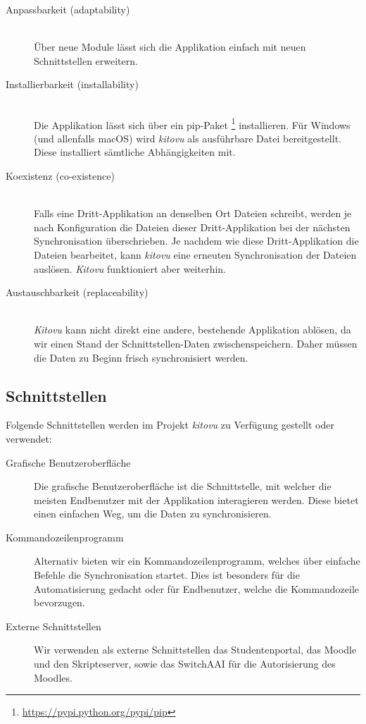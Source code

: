 \documentclass[a4paper]{article}
\begin{document}
\begin{description}
  \item[Anpassbarkeit (adaptability)] \strut \\
    Über neue Module lässt sich die Applikation einfach mit neuen Schnittstellen erweitern.
  \item[Installierbarkeit (installability)] \strut \\
    Die Applikation lässt sich über ein pip-Paket \footnote{\url{https://pypi.python.org/pypi/pip}} installieren. Für Windows (und allenfalls macOS) wird \emph{kitovu} als ausführbare Datei bereitgestellt. Diese installiert sämtliche Abhängigkeiten mit.
  \item[Koexistenz (co-existence)] \strut \\
    Falls eine Dritt-Applikation an denselben Ort Dateien schreibt, werden je nach Konfiguration die Dateien dieser Dritt-Applikation bei der nächsten Synchronisation überschrieben.
    Je nachdem wie diese Dritt-Applikation die Dateien bearbeitet, kann \emph{kitovu} eine erneuten Synchronisation der Dateien auslösen. \emph{Kitovu} funktioniert aber weiterhin.
  \item[Austauschbarkeit (replaceability)] \strut \\
    \emph{Kitovu} kann nicht direkt eine andere, bestehende Applikation ablösen, da wir einen Stand der Schnittstellen-Daten zwischenspeichern.
    Daher müssen die Daten zu Beginn frisch synchronisiert werden.
\end{description}

\subsection{Schnittstellen}

Folgende Schnittstellen werden im Projekt \emph{kitovu} zu Verfügung gestellt oder verwendet:

\begin{description}
  \item[Grafische Benutzeroberfläche]
    Die grafische Benutzeroberfläche ist die Schnittstelle, mit welcher die meisten Endbenutzer mit der Applikation interagieren werden.
    Diese bietet einen einfachen Weg, um die Daten zu synchronisieren.
  \item[Kommandozeilenprogramm]
    Alternativ bieten wir ein Kommandozeilenprogramm, welches über einfache Befehle die Synchronisation startet.
    Dies ist besonders für die Automatisierung gedacht oder für Endbenutzer, welche die Kommandozeile bevorzugen.
  \item[Externe Schnittstellen]
    Wir verwenden als externe Schnittstellen das Studentenportal, das Moodle und den Skripteserver, sowie das SwitchAAI für die Autorisierung des Moodles.
\end{description}
\end{document}
